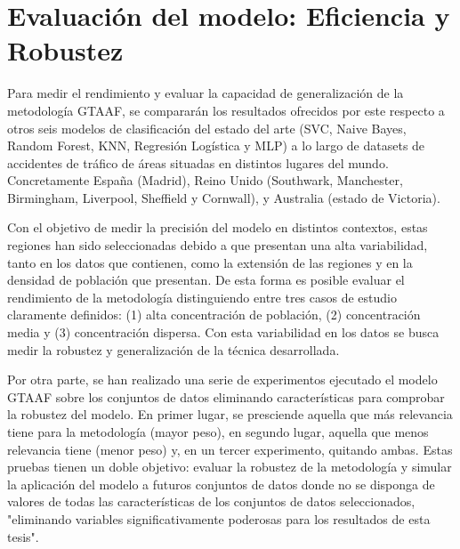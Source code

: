 \documentclass{uathesis-es}
\begin{document}
\section{Evaluación del modelo: Eficiencia y Robustez}

Para medir el rendimiento y evaluar la capacidad de generalización de la metodología GTAAF, se compararán los resultados ofrecidos por este respecto a otros seis modelos de clasificación del estado del arte (SVC, Naive Bayes, Random Forest, KNN, Regresión Logística y MLP) a lo largo de datasets de accidentes de tráfico de áreas situadas en distintos lugares del mundo. Concretamente España (Madrid), Reino Unido (Southwark, Manchester, Birmingham, Liverpool, Sheffield y Cornwall), y Australia (estado de Victoria).

Con el objetivo de medir la precisión del modelo en distintos contextos, estas regiones han sido seleccionadas debido a que presentan una alta variabilidad, tanto en los datos que contienen, como la extensión de las regiones y en la densidad de población que presentan. De esta forma es posible evaluar el rendimiento de la metodología distinguiendo entre tres casos de estudio claramente definidos: (1) alta concentración de población, (2) concentración media y (3) concentración dispersa. Con esta variabilidad en los datos se busca medir la robustez y generalización de la técnica desarrollada.

Por otra parte, se han realizado una serie de experimentos ejecutado el modelo GTAAF sobre los conjuntos de datos eliminando características para comprobar la robustez del modelo. En primer lugar, se presciende aquella que más relevancia tiene para la metodología (mayor peso), en segundo lugar, aquella que menos relevancia tiene (menor peso) y, en un tercer experimento, quitando ambas. Estas pruebas tienen un doble objetivo: evaluar la robustez de la metodología y simular la aplicación del modelo a futuros conjuntos de datos donde no se disponga de valores de todas las características de los conjuntos de datos seleccionados, "eliminando variables significativamente poderosas para los resultados de esta tesis".
\end{document}
